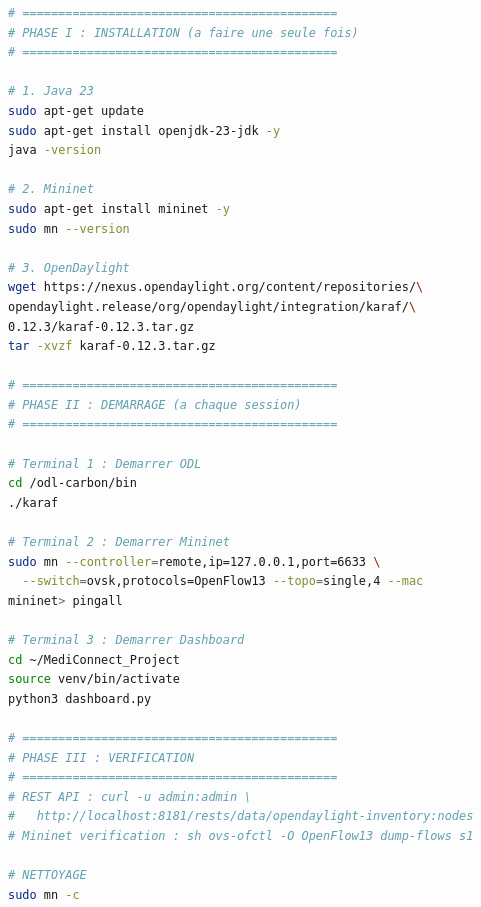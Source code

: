\documentclass[12pt,a4paper]{article}
\begin{document}
\begin{lstlisting}[language=bash, caption={Procédure complète de démarrage de l'environnement SDN}]
# ============================================
# PHASE I : INSTALLATION (a faire une seule fois)
# ============================================

# 1. Java 23
sudo apt-get update
sudo apt-get install openjdk-23-jdk -y
java -version

# 2. Mininet
sudo apt-get install mininet -y
sudo mn --version

# 3. OpenDaylight
wget https://nexus.opendaylight.org/content/repositories/\
opendaylight.release/org/opendaylight/integration/karaf/\
0.12.3/karaf-0.12.3.tar.gz
tar -xvzf karaf-0.12.3.tar.gz

# ============================================
# PHASE II : DEMARRAGE (a chaque session)
# ============================================

# Terminal 1 : Demarrer ODL
cd /odl-carbon/bin
./karaf

# Terminal 2 : Demarrer Mininet
sudo mn --controller=remote,ip=127.0.0.1,port=6633 \
  --switch=ovsk,protocols=OpenFlow13 --topo=single,4 --mac
mininet> pingall

# Terminal 3 : Demarrer Dashboard
cd ~/MediConnect_Project
source venv/bin/activate
python3 dashboard.py

# ============================================
# PHASE III : VERIFICATION
# ============================================
# REST API : curl -u admin:admin \
#   http://localhost:8181/rests/data/opendaylight-inventory:nodes
# Mininet verification : sh ovs-ofctl -O OpenFlow13 dump-flows s1

# NETTOYAGE
sudo mn -c
\end{lstlisting}
\end{document}

